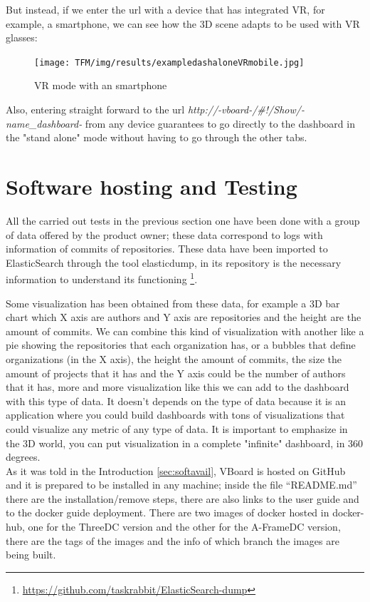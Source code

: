\documentclass[a4paper, 12pt]{book}
\begin{document}
But instead, if we enter the url with a device that has integrated VR, for example, a smartphone, we can see how the 3D scene adapts to be used with VR glasses:

\begin{figure}[H]
  \centering
  \texttt{[image: TFM/img/results/exampledashaloneVRmobile.jpg]}
  \caption{VR mode with an smartphone}
  \label{fig:onlynodes}
\end{figure}
Also, entering straight forward to the url \textit{http://-vboard-/\#!/Show/-name\_dashboard-} from any device guarantees to go directly to the dashboard in the "stand alone" mode without having to go through the other tabs.


\section{Software hosting and Testing}
\label{sec:softhostest}

All the carried out tests in the previous section one have been done with a group of data offered by the product owner; these data correspond to logs with information of commits of repositories.
These data have been imported to ElasticSearch through the tool elasticdump, in its repository is the necessary information to understand its functioning \footnote{\url{https://github.com/taskrabbit/ElasticSearch-dump}}.

Some visualization has been obtained from these
data, for example a 3D bar chart which X axis are authors and Y axis are repositories and the height are the amount of commits. We can combine this kind of visualization with another like a pie showing the repositories that each organization has, or a bubbles that define organizations (in the X axis), the height the amount of commits, the size the amount of projects that it has and the Y axis could be the number of authors that it has, more and more visualization like this we can add to the dashboard with this type of data. It doesn't depends on the type of data because it is an application where you could build dashboards with tons of visualizations that could visualize any metric of any type of data. It is important to emphasize in the 3D world, you can put visualization in a complete "infinite" dashboard, in 360 degrees.\\

As it was told in the Introduction \ref{sec:softavail}, VBoard is hosted on GitHub and it is prepared to be installed in any machine; inside the file “README.md” there are the installation/remove steps, there are also links to the user guide and to the docker guide deployment. There are two images of docker hosted in docker-hub, one for the ThreeDC version and the other for the A-FrameDC version, there are the tags of the images and the info of which branch the images are being built.
\end{document}
